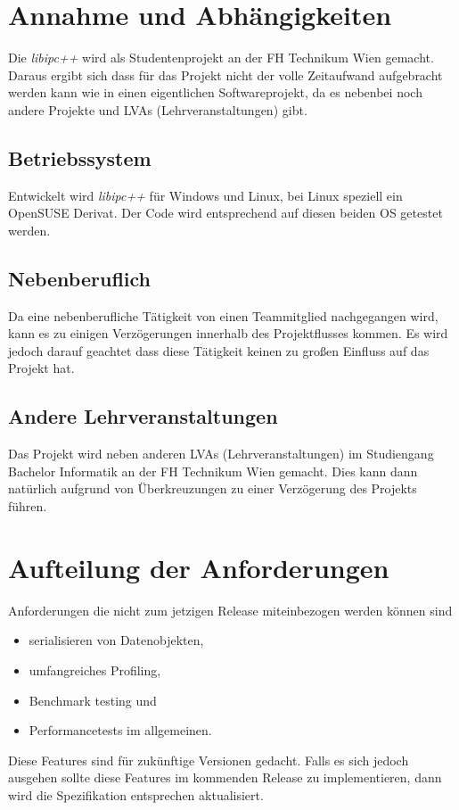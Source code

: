 \documentclass[a4paper]{book}
\begin{document}
\section{Annahme und Abhängigkeiten}
Die \textit{libipc++} wird als Studentenprojekt an der FH Technikum Wien gemacht. Daraus ergibt sich dass für das Projekt nicht der volle Zeitaufwand aufgebracht werden kann wie in einen eigentlichen Softwareprojekt, da es nebenbei noch andere Projekte und LVAs (Lehrveranstaltungen) gibt.

\subsection{Betriebssystem}
Entwickelt wird \textit{libipc++} für Windows und Linux, bei Linux speziell ein OpenSUSE Derivat. Der Code wird entsprechend auf diesen beiden OS getestet werden.

\subsection{Nebenberuflich}
Da eine nebenberufliche Tätigkeit von einen Teammitglied nachgegangen wird, kann es zu einigen Verzögerungen innerhalb des Projektflusses kommen. Es wird jedoch darauf geachtet dass diese Tätigkeit keinen zu großen Einfluss auf das Projekt hat.

\subsection{Andere Lehrveranstaltungen}
Das Projekt wird neben anderen LVAs (Lehrveranstaltungen) im Studiengang Bachelor Informatik an der FH Technikum Wien gemacht. Dies kann dann natürlich aufgrund von Überkreuzungen zu einer Verzögerung des Projekts führen.

\section{Aufteilung der Anforderungen}
Anforderungen die nicht zum jetzigen Release miteinbezogen werden können sind
\begin{itemize}
\item serialisieren von Datenobjekten,
\item umfangreiches Profiling,
\item Benchmark testing und
\item Performancetests im allgemeinen.
\end{itemize}

Diese Features sind für zukünftige Versionen gedacht. Falls es sich jedoch ausgehen sollte diese Features im kommenden Release zu implementieren, dann wird die Spezifikation entsprechen aktualisiert.
\end{document}
